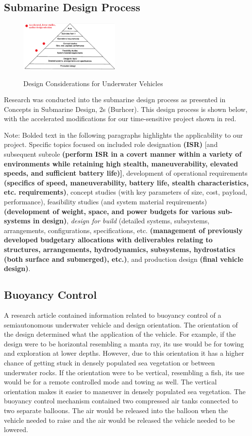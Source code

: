 \documentclass{report}
\begin{document}
\subsection{Submarine Design Process}
\begin{figure}[h]
\centering
\includegraphics[width=5cm]{"Submarine Design"}
\caption{Design Considerations for Underwater Vehicles}
\cite{design}
\end{figure}
Research was conducted into the submarine design process as presented in Concepts in Submarine Design, 2s (Burhcer).  This design process is shown below, with the accelerated modifications for our time-sensitive project shown in red.\par
Note: Bolded text in the following paragraphs highlights the applicability to our project. Specific topics focused on included  role designation \textbf{(ISR)} [and subsequent subrole \textbf{(perform ISR in a covert manner within a variety of environments while retaining high stealth, maneuverability, elevated speeds, and sufficient battery life)]}, development of operational requirements \textbf{(specifics of speed, maneuverability, battery life, stealth characteristics, etc. requirements)}, concept studies (with key parameters of size, cost, payload, performance), feasibility studies (and system material requirements) \textbf{(development of weight, space, and power budgets for various sub-systems in design)}, \textit{design for build} (detailed systems, subsystems, arrangements, configurations, specifications, etc. \textbf{(management of previously developed budgetary allocations with deliverables relating to structures, arrangements, hydrodynamics, subsystems, hydrostatics (both surface and submerged), etc.)}, and production design \textbf{(final vehicle design)}.
\subsection{Buoyancy Control}
A research article contained information related to buoyancy control of a semiautonomous underwater vehicle and design orientation. The orientation of the design determined what the application of the vehicle. For example, if the design were to be horizontal resembling a manta ray, its use would be for towing and exploration at lower depths. However, due to this orientation it has a higher chance of getting stuck in densely populated sea vegetation or between underwater rocks. If the orientation were to be vertical, resembling a fish, its use would be for a remote controlled mode and towing as well. The vertical orientation makes it easier to maneuver in densely populated sea vegetation. The buoyancy control mechanism contained two compressed air tanks connected to two separate balloons. The air would be released into the balloon when the vehicle needed to raise and the air would be released the vehicle needed to be lowered.
\end{document}
